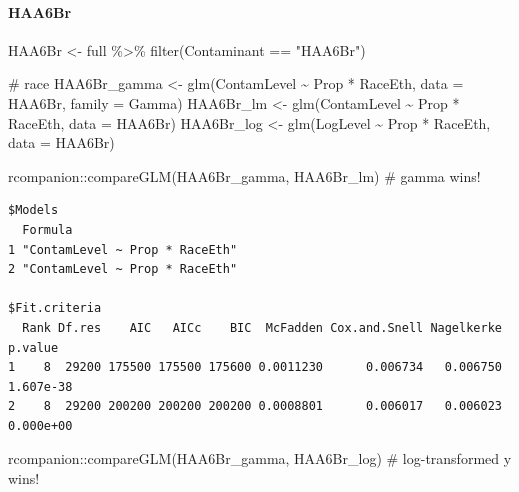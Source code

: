 \documentclass[
  letterpaper,
  DIV=11,
  numbers=noendperiod]{scrartcl}
\let\oldparagraph\paragraph
\renewcommand{\paragraph}[1]{\oldparagraph{#1}\mbox{}}
\newenvironment{Shaded}{\begin{snugshade}}{\end{snugshade}}
\newcommand{\AttributeTok}[1]{\textcolor[rgb]{0.40,0.45,0.13}{#1}}
\newcommand{\CommentTok}[1]{\textcolor[rgb]{0.37,0.37,0.37}{#1}}
\newcommand{\FunctionTok}[1]{\textcolor[rgb]{0.28,0.35,0.67}{#1}}
\newcommand{\NormalTok}[1]{\textcolor[rgb]{0.00,0.23,0.31}{#1}}
\newcommand{\OtherTok}[1]{\textcolor[rgb]{0.00,0.23,0.31}{#1}}
\newcommand{\SpecialCharTok}[1]{\textcolor[rgb]{0.37,0.37,0.37}{#1}}
\newcommand{\StringTok}[1]{\textcolor[rgb]{0.13,0.47,0.30}{#1}}
\begin{document}
\hypertarget{haa6br}{%
\paragraph{HAA6Br}\label{haa6br}}

\begin{Shaded}
\begin{Highlighting}[]
\NormalTok{HAA6Br }\OtherTok{\textless{}{-}}\NormalTok{ full }\SpecialCharTok{\%\textgreater{}\%} 
  \FunctionTok{filter}\NormalTok{(Contaminant }\SpecialCharTok{==} \StringTok{"HAA6Br"}\NormalTok{)}

\CommentTok{\# race}
\NormalTok{HAA6Br\_gamma }\OtherTok{\textless{}{-}} \FunctionTok{glm}\NormalTok{(ContamLevel }\SpecialCharTok{\textasciitilde{}}\NormalTok{ Prop }\SpecialCharTok{*}\NormalTok{ RaceEth, }\AttributeTok{data =}\NormalTok{ HAA6Br, }\AttributeTok{family =}\NormalTok{ Gamma)}
\NormalTok{HAA6Br\_lm }\OtherTok{\textless{}{-}} \FunctionTok{glm}\NormalTok{(ContamLevel }\SpecialCharTok{\textasciitilde{}}\NormalTok{ Prop }\SpecialCharTok{*}\NormalTok{ RaceEth, }\AttributeTok{data =}\NormalTok{ HAA6Br)}
\NormalTok{HAA6Br\_log }\OtherTok{\textless{}{-}} \FunctionTok{glm}\NormalTok{(LogLevel }\SpecialCharTok{\textasciitilde{}}\NormalTok{ Prop }\SpecialCharTok{*}\NormalTok{ RaceEth, }\AttributeTok{data =}\NormalTok{ HAA6Br)}

\NormalTok{rcompanion}\SpecialCharTok{::}\FunctionTok{compareGLM}\NormalTok{(HAA6Br\_gamma, HAA6Br\_lm) }\CommentTok{\# gamma wins!}
\end{Highlighting}
\end{Shaded}

\begin{verbatim}
$Models
  Formula                       
1 "ContamLevel ~ Prop * RaceEth"
2 "ContamLevel ~ Prop * RaceEth"

$Fit.criteria
  Rank Df.res    AIC   AICc    BIC  McFadden Cox.and.Snell Nagelkerke   p.value
1    8  29200 175500 175500 175600 0.0011230      0.006734   0.006750 1.607e-38
2    8  29200 200200 200200 200200 0.0008801      0.006017   0.006023 0.000e+00
\end{verbatim}

\begin{Shaded}
\begin{Highlighting}[]
\NormalTok{rcompanion}\SpecialCharTok{::}\FunctionTok{compareGLM}\NormalTok{(HAA6Br\_gamma, HAA6Br\_log) }\CommentTok{\# log{-}transformed y wins!}
\end{Highlighting}
\end{Shaded}
\end{document}
